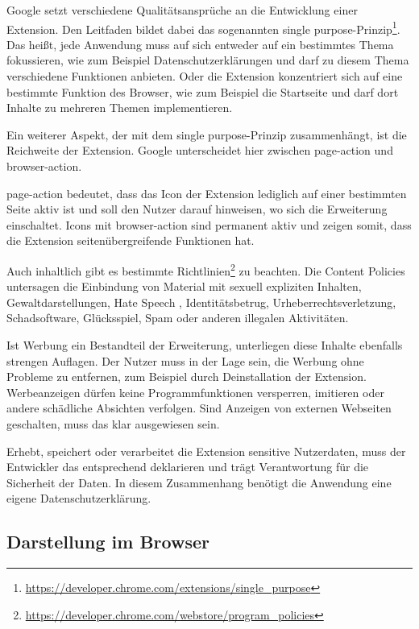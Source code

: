 Google setzt verschiedene Qualitätsansprüche an die Entwicklung einer Extension. Den Leitfaden bildet dabei das sogenannten \glqq single purpose\grqq{}-Prinzip\footnote{\url{https://developer.chrome.com/extensions/single_purpose}}. Das heißt, jede Anwendung muss auf sich entweder auf ein bestimmtes Thema fokussieren, wie zum Beispiel Datenschutzerklärungen und darf zu diesem Thema verschiedene Funktionen anbieten. Oder die Extension konzentriert sich auf eine bestimmte Funktion des Browser, wie zum Beispiel die Startseite und darf dort Inhalte zu mehreren Themen implementieren.

Ein weiterer Aspekt, der mit dem \glqq single purpose\grqq{}-Prinzip zusammenhängt, ist die Reichweite der Extension. Google unterscheidet hier zwischen \glqq page-action\grqq{} und \glqq browser-action\grqq{}.

\glqq page-action\grqq{} bedeutet, dass das Icon der Extension lediglich auf einer bestimmten Seite aktiv ist und soll den Nutzer darauf hinweisen, wo sich die Erweiterung einschaltet. Icons mit \glqq browser-action\grqq{} sind permanent aktiv und zeigen somit, dass die Extension seitenübergreifende Funktionen hat.

Auch inhaltlich gibt es bestimmte Richtlinien\footnote{\url{https://developer.chrome.com/webstore/program_policies}} zu beachten. Die \glqq Content Policies \grqq{} untersagen die Einbindung von Material mit sexuell expliziten Inhalten, Gewaltdarstellungen, \glqq Hate Speech \grqq{}, Identitätsbetrug, Urheberrechtsverletzung, Schadsoftware, Glücksspiel, Spam oder anderen illegalen Aktivitäten.

Ist Werbung ein Bestandteil der Erweiterung, unterliegen diese Inhalte ebenfalls strengen Auflagen. Der Nutzer muss in der Lage sein, die Werbung ohne Probleme zu entfernen, zum Beispiel durch Deinstallation der Extension. Werbeanzeigen dürfen keine Programmfunktionen versperren, imitieren oder andere schädliche Absichten verfolgen. Sind Anzeigen von externen Webseiten geschalten, muss das klar ausgewiesen sein.

Erhebt, speichert oder verarbeitet die Extension sensitive Nutzerdaten, muss der Entwickler das entsprechend deklarieren und trägt Verantwortung für die Sicherheit der Daten. In diesem Zusammenhang benötigt die Anwendung eine eigene Datenschutzerklärung.
\subsection{Darstellung im Browser}
\label{ss:darstellung}

